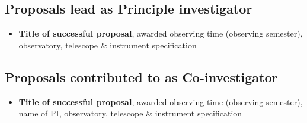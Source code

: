 \subsection*{Proposals lead as Principle investigator}
\begin{itemize}
    \item \textbf{Title of successful proposal}, 
    awarded observing time (observing semester),  
    observatory, telescope \& instrument specification
    
    
    
\end{itemize}


\subsection*{Proposals contributed to as Co-investigator}
\begin{itemize}

    \item \textbf{Title of successful proposal}, 
    awarded observing time (observing semester),  
    name of PI,
    observatory, telescope \& instrument specification
    
    
\end{itemize}
